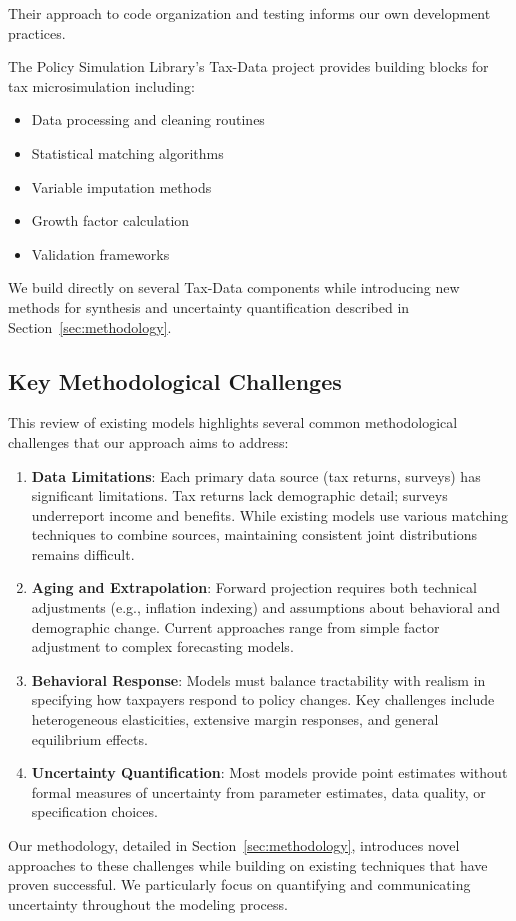 Their approach to code organization and testing informs our own development practices.

The Policy Simulation Library's Tax-Data project \citep{psl2024} provides building blocks for tax microsimulation including:

\begin{itemize}
    \item Data processing and cleaning routines
    \item Statistical matching algorithms
    \item Variable imputation methods
    \item Growth factor calculation
    \item Validation frameworks
\end{itemize}

We build directly on several Tax-Data components while introducing new methods for synthesis and uncertainty quantification described in Section~\ref{sec:methodology}.

\subsection{Key Methodological Challenges}

This review of existing models highlights several common methodological challenges that our approach aims to address:

\begin{enumerate}
    \item \textbf{Data Limitations}: Each primary data source (tax returns, surveys) has significant limitations. Tax returns lack demographic detail; surveys underreport income and benefits. While existing models use various matching techniques to combine sources, maintaining consistent joint distributions remains difficult.
    
    \item \textbf{Aging and Extrapolation}: Forward projection requires both technical adjustments (e.g., inflation indexing) and assumptions about behavioral and demographic change. Current approaches range from simple factor adjustment to complex forecasting models.
    
    \item \textbf{Behavioral Response}: Models must balance tractability with realism in specifying how taxpayers respond to policy changes. Key challenges include heterogeneous elasticities, extensive margin responses, and general equilibrium effects.
    
    \item \textbf{Uncertainty Quantification}: Most models provide point estimates without formal measures of uncertainty from parameter estimates, data quality, or specification choices.
\end{enumerate}

Our methodology, detailed in Section~\ref{sec:methodology}, introduces novel approaches to these challenges while building on existing techniques that have proven successful. We particularly focus on quantifying and communicating uncertainty throughout the modeling process.